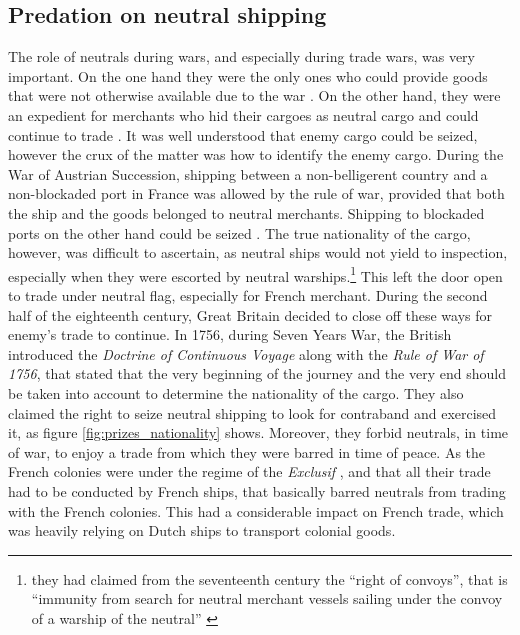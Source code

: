 \documentclass[12pt,a4paper,notitlepage,english]{article}
\begin{document}
\subsection{Predation on neutral shipping}
The role of neutrals during wars, and especially during trade wars, was very important. On the one hand they were the only ones who could provide goods that were not otherwise available due to the war \citep{Hedberg2015}. On the other hand, they were an expedient for merchants who hid their cargoes as neutral cargo and could continue to trade \cite[see][]{Carriere1973,Schnakenbourg2013,Schnakenbourg2015}. 
It was well understood that enemy cargo could be seized, however the crux of the matter was how to identify the enemy cargo.
During the War of Austrian Succession, shipping between a non-belligerent country and a non-blockaded port in France was allowed by the rule of war, provided that both the ship and the goods belonged to neutral merchants. Shipping to blockaded ports on the other hand could be seized \citep[p. 112]{Schnakenbourg2013}. The true nationality of the cargo, however, was difficult to ascertain, as neutral ships would not yield to inspection, especially when they were escorted by neutral warships.\footnote{they had claimed from the seventeenth century the ``right of convoys'', that is ``immunity from search for neutral merchant vessels sailing under the convoy of a warship of the neutral'' \citep{TheEditorsofEncyclopaediaBritannica2014}} This left the door open to trade under neutral flag, especially for French merchant. 
During the second half of the eighteenth century, Great Britain decided to close off these ways for enemy's trade to continue. 
In 1756, during Seven Years War, the British introduced the \textit{Doctrine of Continuous Voyage} along with the \textit{Rule of War of 1756}, that stated that the very beginning of the journey and the very end should be taken into account to determine the nationality of the cargo. They also claimed the right to seize neutral shipping to look for contraband and exercised it, as figure \ref{fig:prizes_nationality} shows. 
Moreover, they forbid neutrals, in time of war, to enjoy a trade from which they were barred in time of peace. 
As the French colonies were under the regime of the \textit{Exclusif} \citep{Tarrade1972}, and that all their trade had to be conducted by French ships, that basically barred neutrals from trading with the French colonies.
This had a considerable impact on French trade, which was heavily relying on Dutch ships to transport colonial goods.
\end{document}
